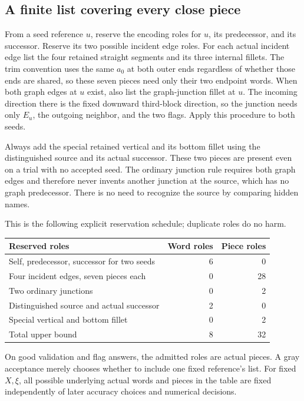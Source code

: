 \subsection{A finite list covering every close piece}
\label{geo:candidates}

From a seed reference $u$, reserve the encoding roles for $u$, its
predecessor, and its successor. Reserve its two possible incident edge
roles. For each actual incident edge list the four retained straight
segments and its three internal fillets. The trim convention uses the
same $a_0$ at both outer ends regardless of whether those ends are
shared, so these seven pieces need only their two endpoint words.
When both graph edges at $u$ exist, also list the graph-junction fillet
at $u$. The incoming direction there is the fixed downward third-block
direction, so the junction needs only $E_u$, the outgoing neighbor,
and the two flags. Apply this procedure to both seeds.

Always add the special retained vertical and its bottom fillet using
the distinguished source and its actual successor. These two pieces
are present even on a trial with no accepted seed. The ordinary
junction rule requires both graph edges and therefore never invents
another junction at the source, which has no graph predecessor.
There is no need to recognize the source by comparing hidden names.

This is the following explicit reservation schedule; duplicate roles
do no harm.
\begin{center}
\begin{tabular}{@{}lrr@{}}
\toprule
Reserved roles&Word roles&Piece roles\\
\midrule
Self, predecessor, successor for two seeds&6&0\\
Four incident edges, seven pieces each&0&28\\
Two ordinary junctions&0&2\\
Distinguished source and actual successor&2&0\\
Special vertical and bottom fillet&0&2\\
\midrule
Total upper bound&8&32\\
\bottomrule
\end{tabular}
\end{center}
On good validation and flag answers, the admitted roles are actual
pieces. A gray acceptance merely chooses whether to include one fixed
reference's list. For fixed $X,\xi$, all possible underlying actual
words and pieces in the table are fixed independently of later accuracy
choices and numerical decisions.


